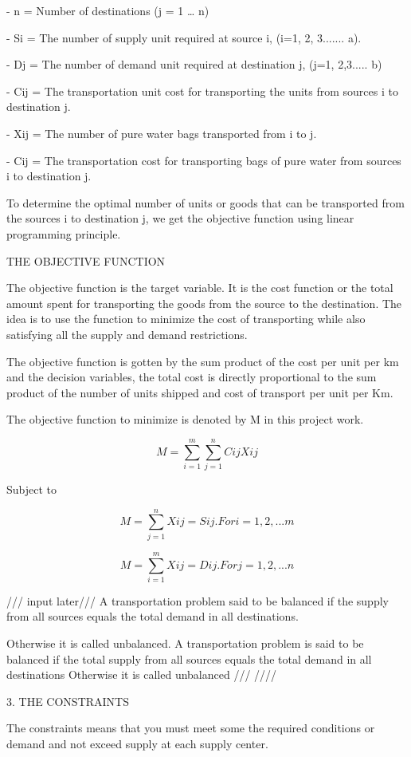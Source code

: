 \documentclass{article}
\begin{document}
- n = Number of destinations (j = 1 … n)

- Si = The number of supply unit required at source i, (i=1, 2, 3....... a).

- Dj = The number of demand unit required at destination j, (j=1, 2,3..... b)

- Cij = The transportation unit cost for transporting the units from sources i to destination j.

- Xij = The number of pure water bags transported from i to j.

- Cij = The transportation cost for transporting bags of pure water from sources i to destination j.

To determine the optimal number of units or goods that can be transported from the sources i to destination j, we get the objective function using linear programming principle.

THE OBJECTIVE FUNCTION

The objective function is the target variable. It is the cost function or the total amount spent for transporting the goods from the source to the destination. The idea is to use the function to minimize the cost of transporting while also satisfying all the supply and demand restrictions.

The objective function is gotten by the sum product of the cost per unit per km and the decision variables, the total cost is directly proportional to the sum product of the number of units shipped and cost of transport per unit per Km.

The objective function to minimize is denoted by M in this project work.

 \[M = \sum_{i=1}^{m} \sum_{j=1}^{n} Cij Xij \]
 
Subject to

 \[M = \sum_{j=1}^{n} Xij = Sij. For  i = 1, 2, ...m \]

 \[M = \sum_{i=1}^{m} Xij = Dij. For j = 1, 2, ...n\]

/// input later///
A transportation problem said to be balanced if the
supply from all sources equals the total demand in all
destinations.

Otherwise it is called unbalanced.
A transportation problem is said to be balanced
if the total supply from all sources equals the total
demand in all destinations
Otherwise it is called unbalanced
///     ////

3. THE CONSTRAINTS

The constraints means that you must meet some the required conditions or demand and not exceed supply at each supply center.
\end{document}
